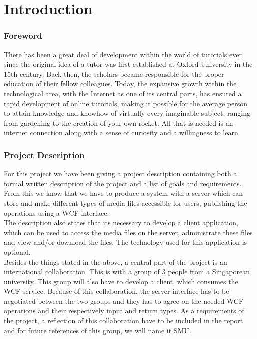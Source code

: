 \part{Introduction}
\section{Foreword}
There has been a great deal of development within the world of tutorials ever since the original idea of a tutor was first established at Oxford University in the 15th century. Back then, the scholars became responsible for the proper education of their fellow colleagues. Today, the expansive growth within the technological area, with the Internet as one of its central parts, has ensured a rapid development of online tutorials, making it possible for the average person to attain knowledge and knowhow of virtually every imaginable subject, ranging from gardening to the creation of your own rocket.
All that is needed is an internet connection along with a sense of curiosity and a willingness to learn.\\


\section{Project Description}
For this project we have been giving a project description containing both a formal written description of the project and a list of goals and requirements. From this we know that we have to produce a system with a server which can store and make different types of media files accessible for users, publishing the operations using a WCF interface.\\
The description also states that its necessary to develop a client application, which can be used to access the media files on the server, administrate these files and view and/or download the files. The technology used for this application is optional.\\ 
Besides the things stated in the above, a central part of the project is an international collaboration. This 	is with a group of 3 people from a Singaporean university. This group will also have to develop a client, which consumes the WCF service. Because of this collaboration, the server interface has to be negotiated between the two groups and they has to agree on the needed WCF operations and their respectively input and return types. As a requirements of the project, a reflection of this collaboration have to be included in the report and for future references of this group, we will name it SMU. \\

